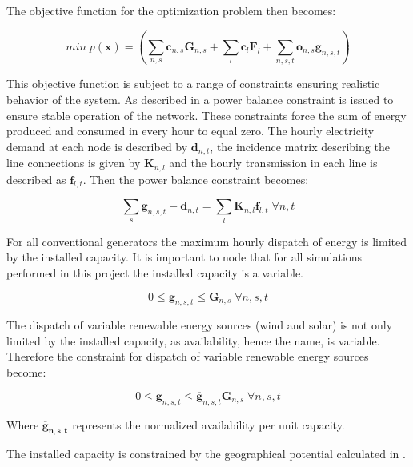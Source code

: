 The objective function for the optimization problem then becomes: 

\begin{equation}
min \; p(\mathbf{x}) = \left( \sum_{n,s} \mathbf{c}_{n,s} \mathbf{G}_{n,s} + \sum_l \mathbf{c}_l \mathbf{F}_l + \sum_{n,s,t} \mathbf{o}_{n,s} \mathbf{g}_{n,s,t} \right)
\end{equation}{}

This objective function is subject to a range of constraints ensuring realistic behavior of the system. As described in \cite{PyPSA_euro_30_model} a power balance constraint is issued to ensure stable operation of the network. These constraints force the sum of energy produced and consumed in every hour to equal zero. The hourly electricity demand at each node is described by $\mathbf{d}_{n,t}$, the incidence matrix describing the line connections is given by $\mathbf{K}_{n,l}$ and the hourly transmission in each line is described as $\mathbf{f}_{l,t}$. Then the power balance constraint becomes:

\begin{equation}
\sum_s \mathbf{g}_{n,s,t} - \mathbf{d}_{n,t} = \sum_l \mathbf{K}_{n,l} \mathbf{f}_{l,t} \; \forall n,t
\end{equation}

For all conventional generators the maximum hourly dispatch of energy is limited by the installed capacity. It is important to node that for all simulations performed in this project the installed capacity is a variable. 

\begin{equation}
0\leq \mathbf{g}_{n,s,t} \leq \mathbf{G}_{n,s} \; \forall n,s,t
\end{equation}

The dispatch of variable renewable energy sources (wind and solar) is not only limited by the installed capacity, as availability, hence the name, is variable. Therefore the constraint for dispatch of variable renewable energy sources become:

\begin{equation}
0 \leq \mathbf{g}_{n,s,t} \leq \mathbf{\overline{g}}_{n,s,t} \mathbf{G}_{n,s} \; \forall n,s,t
\end{equation}

Where $\mathbf{\overline{g}_{n,s,t}}$ represents the normalized availability per unit capacity. 

The installed capacity is constrained by the geographical potential calculated in \cite{PyPSA_euro_30_model}.

